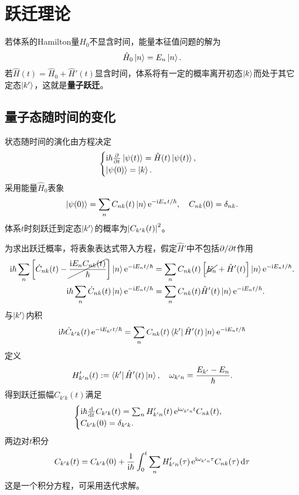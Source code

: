 \chapter{跃迁理论}
若体系的Hamilton量$\hat H_0$不显含时间，能量本征值问题的解为
\[
	\hat H_0\ket n=E_n\ket n.
\]
若$\hat H(t)=\hat H_0+\hat H'(t)$显含时间，体系将有一定的概率离开初态$\ket{k}$而处于其它定态$\ket{k'}$，这就是\textbf{量子跃迁}。
\section{量子态随时间的变化}
状态随时间的演化由\Schr 方程决定
\begin{align}
	\begin{cases}
		\i\hbar\pp t\ket{\psi(t)}=\hat H(t)\ket{\psi(t)},\\
		\ket{\psi(0)}=\ket{k}.
	\end{cases}
\end{align}
采用能量$\hat H_0$表象 
\begin{align}
	\ket{\psi(0)}=\sum_n C_{nk}(t)\ket n\e{-\i E_nt/\hbar},\quad C_{nk}(0)=\vd_{nk}.
\end{align}
体系$t$时刻跃迁到定态$\ket{k'}$的概率为$\abs{C_{k'k}(t)}^2$。

为求出跃迁概率，将表象表达式带入\Schr 方程，假定$\hat H'$中不包括$\p/\p t$作用
\begin{align}\notag
	\i\hbar\sum_n\fkh{\dot C_{nk}(t)-\cancel{\frac{\i E_nC_{nk}(t)}\hbar}}\ket n\e{-\i E_nt/\hbar}&=\sum_nC_{nk}(t)\fkh{\cancel{E_n}+\hat H'(t)}\ket n\e{-\i E_nt/\hbar}.\\
	\i\hbar\sum_n\dot C_{nk}(t)\ket n\e{-\i E_nt/\hbar}&=\sum_nC_{nk}(t)\hat H'(t)\ket n\e{-\i E_nt/\hbar}.
\end{align}
与$\ket{k'}$内积
\begin{align}
	\i\hbar\dot C_{k'k}(t)\e{-\i E_{k'}t/\hbar}=\sum_nC_{nk}(t)\bra{k'}\hat H'(t)\ket n\e{-\i E_nt/\hbar}
\end{align}
定义 
\begin{align}
	H_{k'n}'(t):=\bra{k'}\hat H'(t)\ket n,\quad\omega_{k'n}=\frac{E_{k'}-E_n}\hbar.
\end{align}
得到跃迁振幅$C_{k'k}(t)$满足 
\begin{align}
	\begin{cases}
		\i\hbar\dd tC_{k'k}(t)=\sum_nH'_{k'n}(t)\e{\i\omega_{k'n}t}C_{nk}(t),\\
		C_{k'k}(0)=\vd_{k'k}.
	\end{cases}
\end{align}
两边对$t$积分
\begin{align}
	C_{k'k}(t)=C_{k'k}(0)+\frac1{\i\hbar}\int_0^t\sum_nH'_{k'n}(\tau)\e{\i\omega_{k'n}\tau}C_{nk}(\tau)\d\tau
\end{align}
这是一个积分方程，可采用迭代求解。

